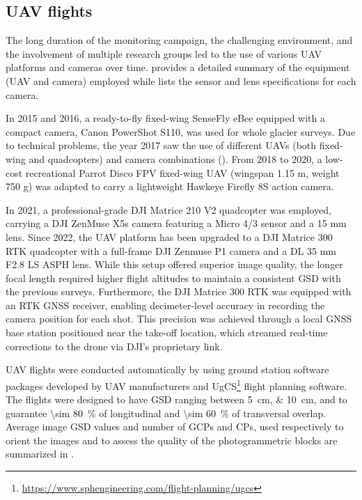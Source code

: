 \subsection{UAV flights}\label{sec:3:uav-flights}

The long duration of the monitoring campaign, the challenging environment, and the involvement of multiple research groups led to the use of various UAV platforms and cameras over time. 
 provides a detailed summary of the equipment (UAV and camera) employed while  lists the sensor and lens specifications for each camera.

In 2015 and 2016, a ready-to-fly fixed-wing SenseFly eBee equipped with a compact camera, Canon PowerShot S110, was used for whole glacier surveys.
Due to technical problems, the year 2017 saw the use of different UAVs (both fixed-wing and quadcopters) and camera combinations (). 
From 2018 to 2020, a low-cost recreational Parrot Disco FPV fixed-wing UAV (wingspan 1.15 m, weight 750 g) was adapted to carry a lightweight Hawkeye Firefly 8S action camera.

In 2021, a professional-grade DJI Matrice 210 V2 quadcopter was employed, carrying a 
DJI ZenMuse X5s camera featuring a Micro 4/3 sensor and a 15 mm lens. 
Since 2022, the UAV platform has been upgraded to a DJI Matrice 300 RTK quadcopter
with a full-frame DJI Zenmuse P1 camera and a DL 35 mm F2.8 LS ASPH lens.
While this setup offered superior image quality, the longer focal length required 
higher flight altitudes to maintain a consistent GSD with the previous surveys.
Furthermore, the DJI Matrice 300 RTK was equipped with an RTK GNSS receiver, enabling 
decimeter-level accuracy in recording the camera position for each shot. 
This precision was achieved through a local GNSS base station positioned near the take-off 
location, which streamed real-time corrections to the drone via DJI's proprietary link.

UAV flights were conducted automatically by using ground station software packages
developed by UAV manufacturers and UgCS\footnote{\url{https://www.sphengineering.com/flight-planning/ugcs}} flight planning software.
The flights were designed to have GSD ranging between \qtylist{5;10}{\centi\meter}, and
to guarantee \qty{\sim 80}{\percent} of longitudinal and \qty{\sim 60}{\percent} of
transversal overlap.
Average image GSD values and number of GCPs and CPs, used respectively to orient the
images and to assess the quality of the photogrammetric blocks are summarized in
.

